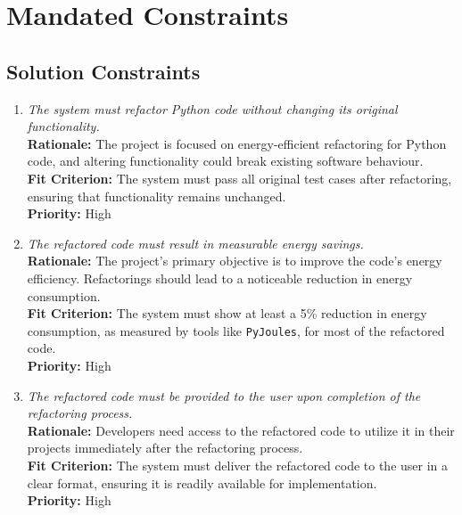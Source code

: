 \documentclass[12pt]{article}
\begin{document}
\section{Mandated Constraints}
\subsection{Solution Constraints}
\begin{enumerate}[label=MD-SL \arabic*., wide=0pt, leftmargin=*]
    \item \emph{The system must refactor Python code without changing its original functionality.}\\[2mm]
    {\bf Rationale:} The project is focused on energy-efficient refactoring for Python code, and altering functionality could break existing software behaviour.\\
    {\bf Fit Criterion:} The system must pass all original test cases after refactoring, ensuring that functionality remains unchanged.\\
    {\bf Priority:} High
    \item \emph{The refactored code must result in measurable energy savings.}\\[2mm]
    {\bf Rationale:} The project's primary objective is to improve the code's energy efficiency. Refactorings should lead to a noticeable reduction in energy consumption.\\
    {\bf Fit Criterion:} The system must show at least a 5\% reduction in energy consumption, as measured by tools like \texttt{PyJoules}, for most of the refactored code.\\
    {\bf Priority:} High
    \item \emph{The refactored code must be provided to the user upon completion of the refactoring process.}\\[2mm]
    {\bf Rationale:} Developers need access to the refactored code to utilize it in their projects immediately after the refactoring process.\\
    {\bf Fit Criterion:} The system must deliver the refactored code to the user in a clear format, ensuring it is readily available for implementation.\\
    {\bf Priority:} High
\end{enumerate}
\end{document}
